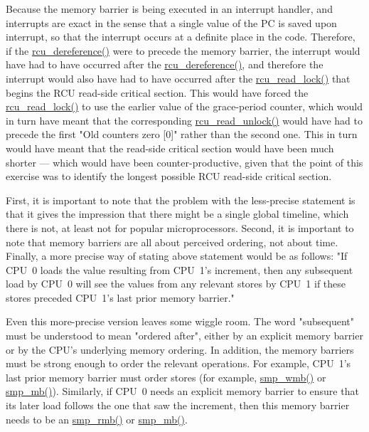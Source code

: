 
	Because the memory barrier is being executed in
	an interrupt handler, and interrupts are exact in the sense that
	a single value of the PC is saved upon interrupt, so that the
	interrupt occurs at a definite place in the code.
	Therefore, if the
	\url{rcu_dereference()} were to precede the memory barrier,
	the interrupt would have had to have occurred after the
	\url{rcu_dereference()}, and therefore
	the interrupt would also have had to have occurred after the
	\url{rcu_read_lock()} that begins the RCU read-side critical
	section.
	This would have forced the \url{rcu_read_lock()} to use
	the earlier value of the grace-period counter, which would in turn
	have meant that the corresponding \url{rcu_read_unlock()}
	would have had to precede the first "Old counters zero [0]" rather
	than the second one.
	This in turn would have meant that the read-side critical section
	would have been much shorter --- which would have been
	counter-productive,
	given that the point of this exercise was to identify the longest
	possible RCU read-side critical section.


	First, it is important to note that the problem with
	the less-precise statement is that it gives the impression that there
	might be a single global timeline, which there is not, at least not for
	popular microprocessors.
	Second, it is important to note that memory barriers are all about
	perceived ordering, not about time.
	Finally, a more precise way of stating above statement would be as
	follows: "If CPU~0 loads the value resulting from CPU~1's
	increment, then any subsequent load by CPU~0 will see the
	values from any relevant stores by CPU~1 if these stores
	preceded CPU~1's last prior memory barrier."

	Even this more-precise version leaves some wiggle room.
	The word "subsequent" must be understood to mean "ordered after",
	either by an explicit memory barrier or by the CPU's underlying
	memory ordering.
	In addition, the memory barriers must be strong enough to order
	the relevant operations.
	For example, CPU~1's last prior memory barrier must order stores
	(for example, \url{smp_wmb()} or \url{smp_mb()}).
	Similarly, if CPU~0 needs an explicit memory barrier to
	ensure that its later load follows the one that saw the increment,
	then this memory barrier needs to be an \url{smp_rmb()}
	or \url{smp_mb()}.

